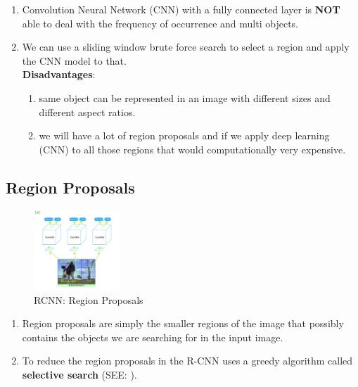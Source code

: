 \begin{enumerate}
    \item Convolution Neural Network (CNN) with a fully connected layer is \textbf{NOT} able to deal with the frequency of occurrence and multi objects.

    \item We can use a sliding window brute force search to select a region and apply the CNN model to that.\\
    \textbf{Disadvantages}:
    \begin{enumerate}
        \item same object can be represented in an image with different sizes and different aspect ratios.

        \item we will have a lot of region proposals and if we apply deep learning (CNN) to all those regions that would computationally very expensive.

    \end{enumerate}
    
\end{enumerate}

\subsection{Region Proposals \cite{arxiv-1311.2524v5-rcnn,https://www.geeksforgeeks.org/r-cnn-region-based-cnns/}}

\begin{table}[H]
    \begin{minipage}[t]{0.49\linewidth}
        \begin{figure}[H]
            \centering
            \includegraphics[width=\linewidth, height=3cm, keepaspectratio]{Pictures/convolutional-neural-network/rcnn-region-proposals.jpg}
            \caption*{RCNN: Region Proposals}
        \end{figure}        
    \end{minipage}
    \hfill
    \begin{minipage}[t]{0.49\linewidth}
        \begin{enumerate}
            \item Region proposals are simply the smaller regions of the image that possibly contains the objects we are searching for in the input image.
        
            \item To reduce the region proposals in the R-CNN uses a greedy algorithm called \textbf{selective search} (SEE: ).
        \end{enumerate}
    \end{minipage}
\end{table}


